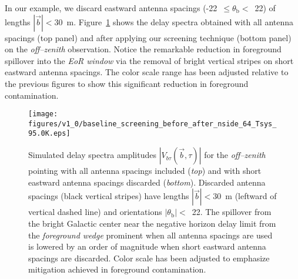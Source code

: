 \documentclass[preprint2,iop,numberedappendix]{emulateapj}
\begin{document}
In our example, we discard eastward antenna spacings (-22~$\le\theta_\textrm{b}<$~22) of lengths $|\vec{b}| < 30$~m. Figure~\ref{fig:before-after} shows the delay spectra obtained with all antenna spacings (top panel) and after applying our screening technique (bottom panel) on the {\it off--zenith} observation. Notice the remarkable reduction in foreground spillover into the {\it EoR window} via the removal of bright vertical stripes on short eastward antenna spacings. The color scale range has been adjusted relative to the previous figures to show this significant reduction in foreground contamination. 

\begin{figure}[htb]
\centering
\texttt{[image: figures/v1\_0/baseline\_screening\_before\_after\_nside\_64\_Tsys\_95.0K.eps]}
\caption{Simulated delay spectra amplitudes $|V_{b\tau}(\vec{b},\tau)|$ for the {\it off--zenith} pointing with all antenna spacings included ({\it top}) and with short eastward antenna spacings discarded ({\it bottom}). Discarded antenna spacings (black vertical stripes) have lengths $|\vec{b}|<30$~m (leftward of vertical dashed line) and orientations $|\theta_\textrm{b}|<$~22. The spillover from the bright Galactic center near the negative horizon delay limit from the {\it foreground wedge} prominent when all antenna spacings are used is lowered by an order of magnitude when short eastward antenna spacings are discarded. Color scale has been adjusted to emphasize mitigation achieved in foreground contamination. \label{fig:before-after}}
\end{figure}
\end{document}
